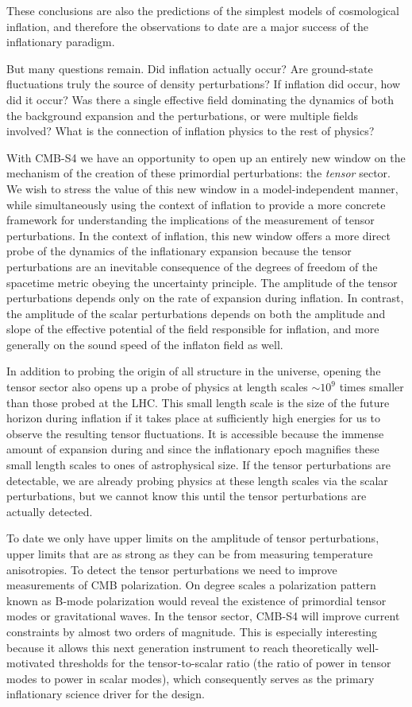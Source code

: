 These conclusions are also the predictions of the simplest models of cosmological inflation, and therefore the observations to date are a major success of the inflationary paradigm. 

But many questions remain. Did inflation actually occur? Are ground-state fluctuations truly the source of density perturbations? If inflation did occur, how did it occur? Was there a single effective field dominating the dynamics of both the background expansion and the perturbations, or were multiple fields involved? What is the connection of inflation physics to the rest of physics?

With CMB-S4 we have an opportunity to open up an entirely new window on the mechanism of the creation of these primordial perturbations: the {\em tensor} sector. We wish to stress the value of this new window in a model-independent manner, while simultaneously using the context of 
inflation to provide a more concrete framework for understanding the implications of the measurement of tensor perturbations. In the context of inflation, this new window offers a more direct probe of the dynamics of the inflationary expansion because the tensor perturbations are an inevitable consequence of the degrees of freedom of the spacetime metric obeying the uncertainty principle. The amplitude of the tensor perturbations depends only on the rate of expansion during inflation. In contrast, the amplitude of the scalar perturbations depends on both the amplitude and slope of the effective potential of the field responsible for inflation, and more generally on the sound speed of the inflaton field as well.

In addition to probing the origin of all structure in the universe, opening the tensor sector also opens up a probe of physics at length scales $\sim 10^9$ times smaller than those probed at the LHC. This small length scale is the size of the future horizon during inflation if it takes place at sufficiently high energies for us to observe the resulting tensor fluctuations. It is accessible because the immense amount of expansion during and since the inflationary epoch magnifies
these small length scales to ones of astrophysical size. If the tensor perturbations are detectable, we are already probing physics at these length scales via the scalar perturbations, but we cannot know this until the tensor perturbations are actually detected.

To date we only have upper limits on the amplitude of tensor perturbations, upper limits that are as strong as they can be from measuring temperature anisotropies. To detect the tensor perturbations we need to improve measurements of CMB polarization. On degree scales a polarization pattern known as B-mode polarization would reveal the existence of primordial tensor modes or gravitational waves. In the tensor sector, CMB-S4 will improve current constraints by almost two orders of magnitude. This is especially interesting because it allows this next generation instrument to reach theoretically well-motivated thresholds for the tensor-to-scalar ratio (the ratio of power in tensor modes to power in scalar modes), which consequently serves as the primary inflationary science driver for the design. 

